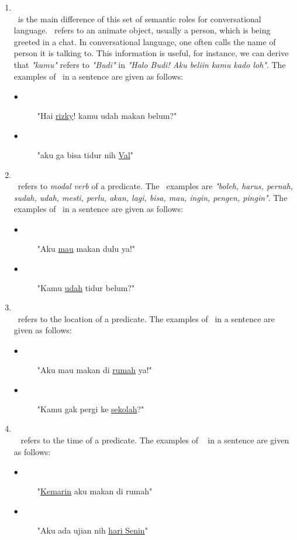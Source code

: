 \begin{enumerate}
	\item \greet\\
	\greet~is the main difference of this set of semantic roles for conversational language. \greet~refers to an animate object, usually a person, which is being greeted in a chat. In conversational language, one often calls the name of person it is talking to. This information is useful, for instance, we can derive that \textit{"kamu"} refers to \textit{"Budi"} in \textit{"Halo Budi! Aku beliin kamu kado loh"}. The examples of \greet~in a sentence are given as follows:
	\begin{description}
		\item[$\bullet$] "Hai \underline{rizky}! kamu udah makan belum?"
		\item[$\bullet$] "aku ga bisa tidur nih \underline{Val}"
	\end{description}

	\item \modal\\
	\modal~refers to \textit{modal verb} of a predicate. The \modal~examples are \textit{"boleh, harus, pernah, sudah, udah, mesti, perlu, akan, lagi, bisa, mau, ingin, pengen, pingin"}. The examples of \modal~in a sentence are given as follows:
	\begin{description}
		\item[$\bullet$] "Aku \underline{mau} makan dulu ya!"
		\item[$\bullet$] "Kamu \underline{udah} tidur belum?"
	\end{description}

	\item \location\\
	\location~refers to the location of a predicate. The examples of \location~in a sentence are given as follows:
	\begin{description}
		\item[$\bullet$] "Aku mau makan di \underline{rumah} ya!"
		\item[$\bullet$] "Kamu gak pergi ke \underline{sekolah}?"
	\end{description}

	\item \timesrl\\
	\timesrl~ refers to the time of a predicate. The examples of \timesrl~ in a sentence are given as follows:
	\begin{description}
		\item[$\bullet$] "\underline{Kemarin} aku makan di rumah"
		\item[$\bullet$] "Aku ada ujian nih \underline{hari Senin}"
	\end{description}
\end{enumerate}

